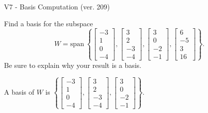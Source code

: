 \begin{exercise}
  \begin{exerciseTitle}V7 - Basis Computation (ver. 209)\end{exerciseTitle}
  \begin{exerciseStatement}
    Find a basis for the subspace 
\[W=\mathrm{span}\ \left\{\left[\begin{array}{r}
-3 \\
1 \\
0 \\
-4
\end{array}\right] , \left[\begin{array}{r}
3 \\
2 \\
-3 \\
-4
\end{array}\right] , \left[\begin{array}{r}
3 \\
0 \\
-2 \\
-1
\end{array}\right] , \left[\begin{array}{r}
6 \\
-5 \\
3 \\
16
\end{array}\right]\right\}.\]
 Be sure to explain why your result is a basis.


  \end{exerciseStatement}
  \begin{exerciseAnswer}
   A basis of \(W\) is  \(\left\{\left[\begin{array}{r}
-3 \\
1 \\
0 \\
-4
\end{array}\right] , \left[\begin{array}{r}
3 \\
2 \\
-3 \\
-4
\end{array}\right] , \left[\begin{array}{r}
3 \\
0 \\
-2 \\
-1
\end{array}\right]\right\}\).
  


  \end{exerciseAnswer}
\end{exercise}